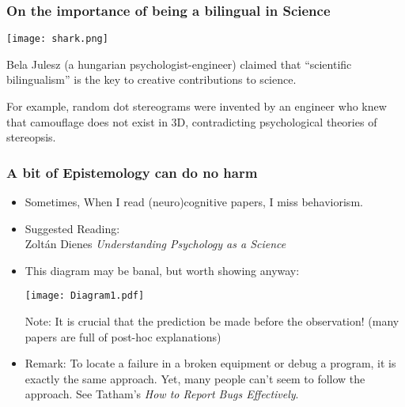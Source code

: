 \documentclass{beamer}
\begin{document}



\begin{frame}
\frametitle{On the importance of being a bilingual in Science}

\begin{center}
\texttt{[image: shark.png]}
\end{center}

\vspace*{2cm}

Bela Julesz (a hungarian psychologist-engineer) claimed that
``scientific bilingualism'' is the key to creative contributions to
science.

For example, random dot stereograms were invented by an engineer who
knew that camouflage does not exist in 3D, contradicting psychological
theories of stereopsis.

\end{frame}



\begin{frame}
\frametitle{A bit of Epistemology can do no harm}

\begin{itemize}

\item Sometimes, When I read (neuro)cognitive papers, I miss behaviorism.

\item Suggested Reading:\\ \quad Zolt\'an Dienes \emph{Understanding Psychology as a Science}

\item This diagram may be banal, but worth showing anyway:

\begin{center}
\texttt{[image: Diagram1.pdf]}
\end{center}


Note: It is crucial that the prediction be made before the observation! (many papers are full of post-hoc explanations)

\fontsize{8pt}{10}\selectfont

\item Remark: To locate a failure in a broken equipment or debug a program, it is exactly the same approach. Yet, many people can't seem to follow the approach. See Tatham's \emph{How to Report Bugs Effectively}.

\end{itemize}

\end{frame}
\end{document}
